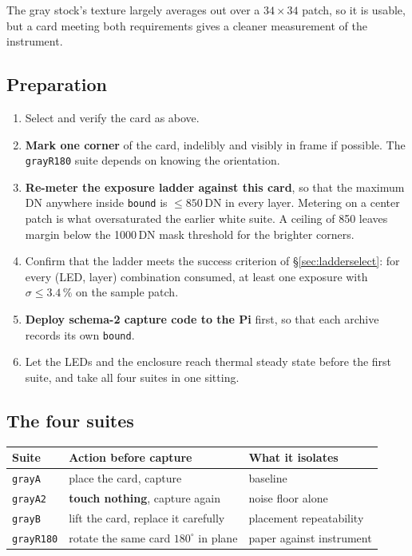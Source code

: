 \documentclass[11pt, a4paper]{article}
\newcommand{\code}[1]{\texttt{#1}}
\newcommand{\pct}{\,\%}
\begin{document}
The gray stock's texture largely averages out over a $34\times34$ patch,
so it is usable,
but a card meeting both requirements gives a cleaner measurement
of the instrument.

\subsection{Preparation}

\begin{enumerate}[nosep]
  \item Select and verify the card as above.
  \item \textbf{Mark one corner} of the card,
        indelibly and visibly in frame if possible.
        The \code{grayR180} suite depends on knowing the orientation.
  \item \textbf{Re-meter the exposure ladder against this card},
        so that the maximum DN anywhere inside \code{bound}
        is $\le 850$\,DN in every layer.
        Metering on a center patch is what oversaturated
        the earlier white suite.
        A ceiling of 850 leaves margin below the 1000\,DN mask threshold
        for the brighter corners.
  \item Confirm that the ladder meets the success criterion of
        \S\ref{sec:ladderselect}:
        for every (LED, layer) combination consumed,
        at least one exposure with $\sigma \le 3.4\pct$
        on the sample patch.
  \item \textbf{Deploy schema-2 capture code to the Pi} first,
        so that each archive records its own \code{bound}.
  \item Let the LEDs and the enclosure reach thermal steady state
        before the first suite,
        and take all four suites in one sitting.
\end{enumerate}

\subsection{The four suites}

\begin{center}
\begin{tabular}{lll}
\toprule
Suite & Action before capture & What it isolates \\
\midrule
\code{grayA}    & place the card, capture & baseline \\
\code{grayA2}   & \textbf{touch nothing}, capture again & noise floor alone \\
\code{grayB}    & lift the card, replace it carefully & placement repeatability \\
\code{grayR180} & rotate the same card $180^{\circ}$ in plane
                & paper against instrument \\
\bottomrule
\end{tabular}
\end{center}
\end{document}
